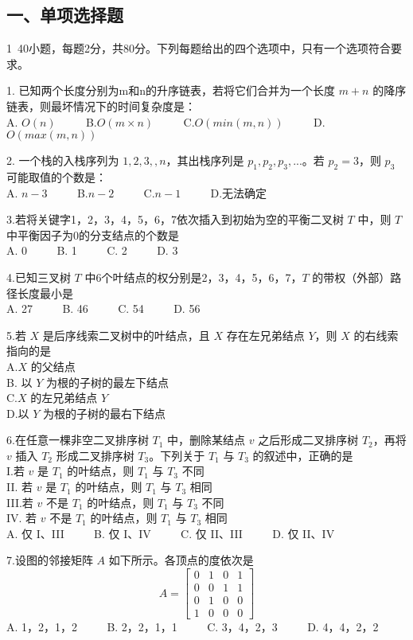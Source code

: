 
\subsection{一、单项选择题}
1~40小题，每题2分，共80分。下列每题给出的四个选项中，只有一个选项符合要求。

1. 已知两个长度分别为m和n的升序链表，若将它们合并为一个长度 $m+n$ 的降序链表，则最坏情况下的时间复杂度是： \\
A. $O(n)$ $\qquad$ B.$O(m \times n)$ $\qquad$ C.$O(min(m,n))$ $\qquad$ D.$O(max(m,n))$

2. 一个栈的入栈序列为 $1,2,3,,n$，其出栈序列是 $p_1, p_2, p_3, ...$。若 $p_2=3$，则 $p_3$ 可能取值的个数是： \\
A. $n-3$  $\qquad$  B.$n-2$ $\qquad$ C.$n-1$ $\qquad$ D.无法确定

3.若将关键字1，2，3，4，5，6，7依次插入到初始为空的平衡二叉树 $T$ 中，则 $T$ 中平衡因子为0的分支结点的个数是 \\
   A. 0 $\qquad$ B. 1 $\qquad$ C. 2 $\qquad$ D. 3

4.已知三叉树 $T$ 中6个叶结点的权分别是2，3，4，5，6，7，$T$ 的带权（外部）路径长度最小是 \\
   A. 27 $\qquad$ B. 46 $\qquad$ C. 54 $\qquad$ D. 56 

5.若 $X$ 是后序线索二叉树中的叶结点，且 $X$ 存在左兄弟结点 $Y$，则 $X$ 的右线索指向的是 \\
A.$X$ 的父结点 \\
B. 以 $Y$ 为根的子树的最左下结点 \\
C.$X$ 的左兄弟结点 $Y$ \\
D.以 $Y$ 为根的子树的最右下结点

6.在任意一棵非空二叉排序树 $T_1$ 中，删除某结点 $v$ 之后形成二叉排序树 $T_2$，再将 $v$ 插入 $T_2$ 形成二叉排序树 $T_3$。下列关于 $T_1$ 与 $T_3$ 的叙述中，正确的是  \\
I.若 $v$ 是 $T_1$ 的叶结点，则 $T_1$ 与 $T_3$ 不同 \\
II.	若 $v$ 是 $T_1$ 的叶结点，则 $T_1$ 与 $T_3$ 相同 \\
III.若 $v$ 不是 $T_1$ 的叶结点，则 $T_1$ 与 $T_3$ 不同 \\
IV.	若 $v$ 不是 $T_1$ 的叶结点，则 $T_1$ 与 $T_3$ 相同 \\
A. 仅 I、III $\qquad$ B. 仅 I、IV $\qquad$ C. 仅 II、III $\qquad$ D. 仅 II、IV

7.设图的邻接矩阵 $A$ 如下所示。各顶点的度依次是 \\
\begin{equation}
A=\begin{bmatrix}
0 & 1 & 0 & 1 \\
0 & 0 & 1 & 1 \\
0 & 1 & 0 & 0 \\
1 & 0 & 0 & 0
\end{bmatrix}
\end{equation}
A. 1，2，1，2 $\qquad$ B. 2，2，1，1 $\qquad$ C. 3，4，2，3 $\qquad$ D. 4，4，2，2

